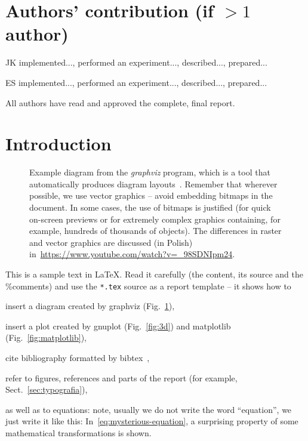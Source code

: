 \documentclass{article}
\begin{document}


\section*{Authors' contribution (if $>1$ author)}
\begin{tightlist}
\item JK implemented..., performed an experiment..., described..., prepared...
\item ES implemented..., performed an experiment..., described..., prepared...
\item All authors have read and approved the complete, final report.
\end{tightlist}




\section{Introduction}

\begin{figure} %
\begin{center}
\end{center}
\caption{Example diagram from the \emph{graphviz} program, which is a tool that automatically produces diagram layouts~\cite{graphviz}. Remember that wherever possible, we use vector graphics -- avoid embedding bitmaps in the document. In some cases, the use of bitmaps is justified (for quick on-screen previews or for extremely complex graphics containing, for example, hundreds of thousands of objects). The differences in raster and vector graphics are discussed (in Polish) in~\url{https://www.youtube.com/watch?v=_98SDNIpm24}.}
\label{fig:schemat}
\end{figure}


This is a sample text in LaTeX. Read it carefully (the content, its source and the \%comments) and use the \texttt{*.tex} source as a report template -- it shows how to

\begin{tightlist}
\item insert a diagram created by graphviz (Fig.~\ref{fig:schemat}),
\item insert a plot created by gnuplot (Fig.~\ref{fig:3d}) and matplotlib (Fig.~\ref{fig:matplotlib}),
\item cite bibliography formatted by bibtex~\cite{LS-lectures,Goldberg-2002},
\item refer to figures, references and parts of the report (for example, Sect.~\ref{sec:typografia}),
\item as well as to equations: note, usually we do not write the word ``equation'', we just write it like this: In~\eqref{eq:mysterious-equation}, a surprising property of some mathematical transformations is shown.
\end{tightlist}
\end{document}
